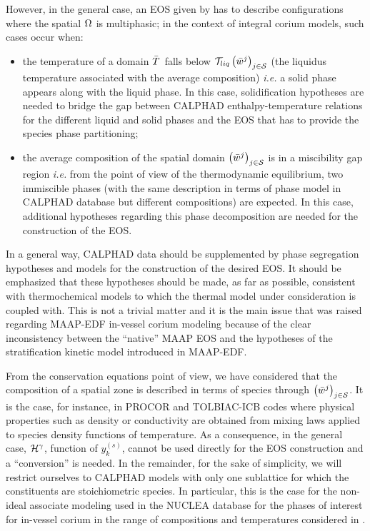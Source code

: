 However, in the general case, an EOS given by  has to describe configurations where the spatial $\Omega_{}$ is multiphasic; in the context of integral corium models, such cases occur when:
\begin{itemize}
\item the temperature of a domain $\avTemperature{}$ falls below $\Mc{T}_{liq}\left(\avMassFraction[j]{}\right)_{j\in \speciesSet}$ (the liquidus temperature associated with the average composition) \textit{i.e.} a solid phase appears along with the liquid phase. In this case, solidification hypotheses are needed to bridge the gap between CALPHAD enthalpy-temperature relations for the different liquid and solid phases and the EOS that has to provide the species phase partitioning;
\item the average composition of the spatial domain $\left(\avMassFraction[j]{}\right)_{j\in \speciesSet}$ is in a miscibility gap region \textit{i.e.} from the point of view of the thermodynamic equilibrium, two immiscible phases (with the same description in terms of phase model in CALPHAD database but different compositions) are expected. In this case, additional hypotheses regarding this phase decomposition are needed for the construction of the EOS.
\end{itemize}
In a general way, CALPHAD data should be supplemented by phase segregation hypotheses and models for the construction of the desired EOS. It should be emphasized that these hypotheses should be made, as far as possible, consistent with thermochemical models to which the thermal model under consideration is coupled with. This is not a trivial matter and it is the main issue that was raised regarding MAAP-EDF in-vessel corium modeling because of the clear inconsistency between the ``native'' MAAP EOS and the hypotheses of the stratification kinetic model introduced in MAAP-EDF. 

\begin{remark}
From the conservation equations point of view, we have considered that the composition of a spatial zone is described in terms of species through $\left(\avMassFraction[j]{}\right)_{j\in \speciesSet}$. It is the case, for instance, in PROCOR and TOLBIAC-ICB \cite{Spindler2006} codes where physical properties such as density or conductivity are obtained from mixing laws applied to species density functions of temperature. 
As a consequence, in the general case, ${\mathcal H}^{\gamma}$, function of $y_{k}^{(s)}$, cannot be used directly for the EOS construction and a ``conversion'' is needed. In the remainder, for the sake of simplicity, we will restrict ourselves to CALPHAD models with only one sublattice for which the constituents are stoichiometric species. In particular, this is the case for the non-ideal associate modeling used in the NUCLEA database \cite{Cheynet2002} for the phases of interest for in-vessel corium in the range of compositions and temperatures considered in .
\end{remark}

